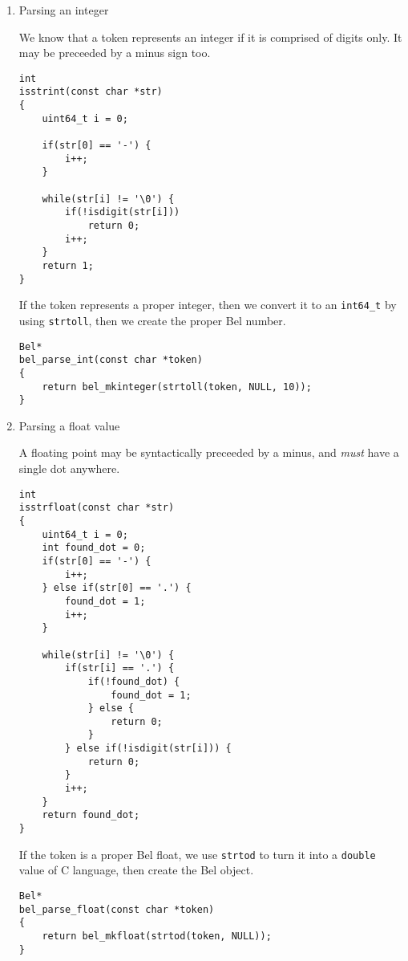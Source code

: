 \documentclass[openright,a4paper,twoside,12pt]{memoir}
\begin{document}
\begin{enumerate}
\item Parsing an integer
\label{sec:orgf2bcb96}

We  know that  a token  represents an  integer if  it is  comprised of
digits only. It may be preceeded by a minus sign too.

\begin{verbatim}
int
isstrint(const char *str)
{
    uint64_t i = 0;

    if(str[0] == '-') {
        i++;
    }

    while(str[i] != '\0') {
        if(!isdigit(str[i]))
            return 0;
        i++;
    }
    return 1;
}
\end{verbatim}

If the  token represents a  proper integer, then  we convert it  to an
\texttt{int64\_t} by using \texttt{strtoll}, then we create the proper Bel number.

\begin{verbatim}
Bel*
bel_parse_int(const char *token)
{
    return bel_mkinteger(strtoll(token, NULL, 10));
}
\end{verbatim}

\item Parsing a float value
\label{sec:org334b83c}

A floating point  may be syntactically preceeded by a  minus, and \emph{must}
have a single dot anywhere.

\begin{verbatim}
int
isstrfloat(const char *str)
{
    uint64_t i = 0;
    int found_dot = 0;
    if(str[0] == '-') {
        i++;
    } else if(str[0] == '.') {
        found_dot = 1;
        i++;
    }

    while(str[i] != '\0') {
        if(str[i] == '.') {
            if(!found_dot) {
                found_dot = 1;
            } else {
                return 0;
            }
        } else if(!isdigit(str[i])) {
            return 0;
        }
        i++;
    }
    return found_dot;
}
\end{verbatim}

If the token  is a proper Bel float,  we use \texttt{strtod} to turn  it into a
\texttt{double} value of C language, then create the Bel object.

\begin{verbatim}
Bel*
bel_parse_float(const char *token)
{
    return bel_mkfloat(strtod(token, NULL));
}
\end{verbatim}


\end{enumerate}
\end{document}
